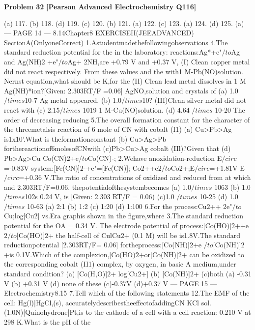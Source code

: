 \begin{problembox}
\textbf{Problem 32} \hfill \textbf{[Pearson Advanced Electrochemistry Q116]}
\label{q:ext-pearson-32}

(a) 117. (b) 118. (d) 119. (c) 120. (b) 121. (a) 122. (c) 123. (a) 124. (d) 125. (a)
--- PAGE 14 ---
8.14Chapter8
EXERCISEII(JEEADVANCED)
SectionA(OnlyoneCorrect)
1.Astudentmadethefollowingobservations
4.The standard reduction potential for the
in the laboratory:
reactions:Ag*+e"$/to$Ag and Ag(NH)2
+e"$/to$Ag+ 2NH,are +0.79 V and +0.37 V,
(I) Clean copper metal did not react
respectively. From these values and the
with1 M-Pb(NO)solution.
Nernst equation,what should be K,for the
(II) Clean lead metal dissolves in 1 M
Ag(NH)*ion?[Given: 2.303RT/F =0.06]
AgNO,solution and crystals of
(a) 1.0 $/times$10-7
Ag metal appeared.
(b) 1.0$/times$10?
(III)Clean silver metal did not react with
(c) 2.15$/times$ 1019
1 M-Cu(NO)solution.
(d) 4.64 $/times$ 10-20
The order of decreasing
reducing
5.The overall formation constant for the
character of the threemetalsis
reaction of 6 mole of CN with cobalt (I1)
(a) Cu>Pb>Ag
is1x10'.What is theformationconstant
(b) Cu>Ag>Pb
forthereactionof6molesofCNwith
(c)Pb>Cu>Ag
cobalt (IIl)?Given that
(d) Pb>Ag>Cu
Co(CN)$2$+e$/to$Co(CN)-;
2.Wehave
anoxidation-reduction
E$/circ$=-0.83V
system:[Fe(CN)]$2$-+e"=[Fe(CN)];
Co$2$++e$2$$/to$Co$2$+;E$/circ$=+1.81V
E$/circ$=+0.36 V.The ratio of concentrations
of oxidized and reduced from at which
and 2.303RT/F=0.06.
thepotentialofthesystembecomes
(a) 1.0$/times$ 1063
(b) 1.0$/times$102s
0.24 V, is [Given: 2.303 RT/F = 0.06)
(c)1.0 $/times$ 10-25
(d) 1.0$/times$ 10-63
(a) 2:1
(b) 1:2
(c) 1:20
(d) 1:100
6.For the process:Cu$2$++ 2e"$/to$Cu;log[Cu$2$]
vs.Era graphis shown in the figure,where
3.The standard reduction potential for the
OA = 0.34 V. The electrode potential of
process:[Co(HO)]$2$++e$2$$/to$[Co(HO)]$2$+
the half-cell of CulCu$2$+ (0.1 M) will be
is1.8V.The standard reductionpotential
[2.303RT/F= 0.06]
fortheprocess:[Co(NH)]$2$+e
$/to$[Co(NH)]$2$+is 0.1V.Which of the
complexion,[Co(HO)$2$+or[Co(NH)]$2$+
can be oxidized to the corresponding
cobalt (II1) complex, by oxygen, in basic
A
medium,under standard condition?
(a) [Co(H,O)]$2$+
log[Cu2+]
(b) [Co(NH)]$2$+
(c)both
(a) -0.31 V
(b) +0.31 V
(d) none of these
(c)-0.37V
(d)+0.37 V
--- PAGE 15 ---
Electrochemistry8.15
7.Tell which of the following statements
12.The EMF of the cell: Hg(l)|HgCl,(s),
accuratelydescribestheeffectofaddingCN
KCl sol.(1.0N)|Quinohydrone|Pt,is
to the cathode of a cell with a cell reaction:
0.210 V at 298 K.What is the pH of the

\end{problembox}
